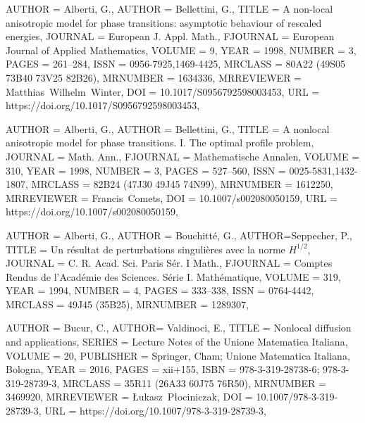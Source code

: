 \documentclass[10pt,a4paper]{amsart}
\numberwithin{equation}{section}
\begin{document}
  \begin{bibdiv}
\begin{biblist}   

 {
    AUTHOR = {Alberti, G.},
    AUTHOR = {Bellettini, G.},
     TITLE = {A non-local anisotropic model for phase transitions:
              asymptotic behaviour of rescaled energies},
   JOURNAL = {European J. Appl. Math.},
  FJOURNAL = {European Journal of Applied Mathematics},
    VOLUME = {9},
      YEAR = {1998},
    NUMBER = {3},
     PAGES = {261--284},
      ISSN = {0956-7925,1469-4425},
   MRCLASS = {80A22 (49S05 73B40 73V25 82B26)},
  MRNUMBER = {1634336},
MRREVIEWER = {Matthias\ Wilhelm\ Winter},
       DOI = {10.1017/S0956792598003453},
       URL = {https://doi.org/10.1017/S0956792598003453},
}

 {
    AUTHOR = {Alberti, G.},
    AUTHOR = {Bellettini, G.},
     TITLE = {A nonlocal anisotropic model for phase transitions. {I}. {T}he
              optimal profile problem},
   JOURNAL = {Math. Ann.},
  FJOURNAL = {Mathematische Annalen},
    VOLUME = {310},
      YEAR = {1998},
    NUMBER = {3},
     PAGES = {527--560},
      ISSN = {0025-5831,1432-1807},
   MRCLASS = {82B24 (47J30 49J45 74N99)},
  MRNUMBER = {1612250},
MRREVIEWER = {Francis\ Comets},
       DOI = {10.1007/s002080050159},
       URL = {https://doi.org/10.1007/s002080050159},
}

 {
    AUTHOR = {Alberti, G.},
    AUTHOR = {Bouchitt\'e, G.},
    AUTHOR={Seppecher, P.},
     TITLE = {Un r\'esultat de perturbations singuli\`eres avec la norme
              {$H^{1/2}$}},
   JOURNAL = {C. R. Acad. Sci. Paris S\'er. I Math.},
  FJOURNAL = {Comptes Rendus de l'Acad\'emie des Sciences. S\'erie I.
              Math\'ematique},
    VOLUME = {319},
      YEAR = {1994},
    NUMBER = {4},
     PAGES = {333--338},
      ISSN = {0764-4442},
   MRCLASS = {49J45 (35B25)},
  MRNUMBER = {1289307},
}

 {
    AUTHOR = {Bucur, C.},
    AUTHOR= { Valdinoci, E.},
     TITLE = {Nonlocal diffusion and applications},
    SERIES = {Lecture Notes of the Unione Matematica Italiana},
    VOLUME = {20},
 PUBLISHER = {Springer, Cham; Unione Matematica Italiana, Bologna},
      YEAR = {2016},
     PAGES = {xii+155},
      ISBN = {978-3-319-28738-6; 978-3-319-28739-3},
   MRCLASS = {35R11 (26A33 60J75 76R50)},
  MRNUMBER = {3469920},
MRREVIEWER = {\L ukasz\ P\l ociniczak},
       DOI = {10.1007/978-3-319-28739-3},
       URL = {https://doi.org/10.1007/978-3-319-28739-3},
}


\end{biblist}
\end{bibdiv}
\end{document}
